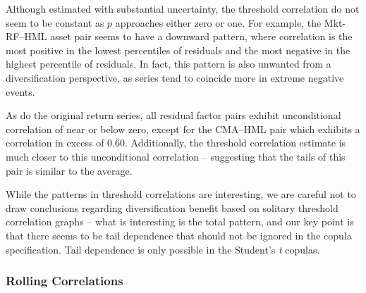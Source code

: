 Although estimated with substantial uncertainty, the threshold correlation do not seem to be constant as $p$ approaches either zero or one. For example, the Mkt-RF--HML asset pair seems to have a downward pattern, where correlation is the most positive in the lowest percentiles of residuals and the most negative in the highest percentile of residuals. In fact, this pattern is also unwanted from a diversification perspective, as series tend to coincide more in extreme negative events. 

As do the original return series, all residual factor pairs exhibit unconditional correlation of near or below zero, except for the CMA--HML pair which exhibits a correlation in excess of $0.60$. Additionally, the threshold correlation estimate is much closer to this unconditional correlation -- suggesting that the tails of this pair is similar to the average.

While the patterns in threshold correlations are interesting, we are careful not to draw conclusions regarding diversification benefit based on solitary threshold correlation graphs -- what is interesting is the total pattern, and our key point is that there seems to be tail dependence that should not be ignored in the copula specification. Tail dependence is only possible in the Student's \textit{t} copulas.

\subsubsection{Rolling Correlations}


